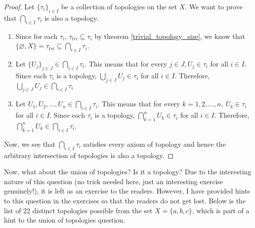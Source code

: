 \begin{proof}
    Let $\{\tau_i\}_{i\in I}$ be a collection of topologies on the set $X$. We want to prove that $\bigcap_{i\in I}\tau_i$ is also a topology.
    \begin{enumerate}
        \item Since for each $\tau_i$, $\tau_{tri}\subseteq\tau_i$ by theorem \eqref{trivial_topology_size}, we know that $\{\varnothing,X\}=\tau_{tri}\subseteq\bigcap_{i\in I}\tau_i$.
        \item Let $\{U_j\}_{j\in J}\in\bigcap_{i\in I}\tau_i$. This means that for every $j\in J, U_j\in\tau_i$ for all $i\in I$. Since each $\tau_i$ is a topology, $\bigcup_{j\in J}U_j\in\tau_i$ for all $i\in I$. Therefore, $\bigcup_{j\in J}U_j\in\bigcap_{i\in I}\tau_i$
        \item Let $U_1,U_2,\dots,U_n\in\bigcap_{i\in I}\tau_i$. This means that for every $k=1,2,\dots,n,\ U_k\in\tau_i$ for all $i\in I$. Since each $\tau_i$ is a topology, $\bigcap_{k=1}^nU_k\in\tau_i$ for all $i\in I$. Therefore, $\bigcap_{k=1}^nU_k\in\bigcap_{i\in I}\tau_i$.
    \end{enumerate}
    Now, we see that $\bigcap_{i\in I}\tau_i$ satisfies every axiom of topology and hence the arbitrary intersection of topologies is also a topology.
\end{proof}
\noindent Now, what about the union of topologies? Is it a topology? Due to the interesting nature of this question (no trick needed here, just an interesting exercise genuinely!), it is left as an exercise to the readers. However, I have provided hints to this question in the exercises so that the readers do not get lost. Below is the list of 22 distinct topologies possible from the set $X=\{a,b,c\}$, which is part of a hint to the union of topologies question.

